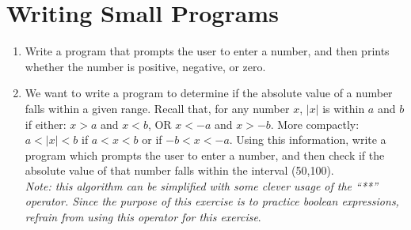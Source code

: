 \documentclass{article}
\begin{document}
\section*{Writing Small Programs}
\begin{enumerate}
\item Write a program that prompts the user to enter a number, and then prints whether the number is positive, negative, or zero.
\item We want to write a program to determine if the absolute value of a number falls within a given range. Recall that, for any number $x$, $|x|$ is within $a$ and $b$ if either: $x>a$ and $x<b$, OR $x<-a$ and $x>-b$. More compactly: $a<|x|<b$ if $a<x<b$ or if $-b<x<-a$. Using this information, write a program which prompts the user to enter a number, and then check if the absolute value of that number falls within the interval (50,100). \\ \textit{Note: this algorithm can be simplified with some clever usage of the ``**'' operator. Since the purpose of this exercise is to practice boolean expressions, refrain from using this operator for this exercise}.
\end{enumerate}
\end{document}
